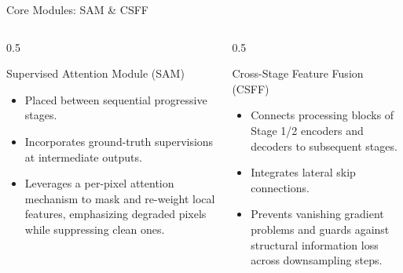 \documentclass[aspectratio=169]{beamer}
\begin{document}
\begin{frame}{Core Modules: SAM \& CSFF}
    \begin{columns}
        \begin{column}{0.5\textwidth}
            \begin{block}{Supervised Attention Module (SAM)}
                \small
                \begin{itemize}
                    \item Placed between sequential progressive stages.
                    \item Incorporates ground-truth supervisions at intermediate outputs.
                    \item Leverages a per-pixel attention mechanism to mask and re-weight local features, emphasizing degraded pixels while suppressing clean ones.
                \end{itemize}
            \end{block}
        \end{column}
        \begin{column}{0.5\textwidth}
            \begin{block}{Cross-Stage Feature Fusion (CSFF)}
                \small
                \begin{itemize}
                    \item Connects processing blocks of Stage 1/2 encoders and decoders to subsequent stages.
                    \item Integrates lateral skip connections.
                    \item Prevents vanishing gradient problems and guards against structural information loss across downsampling steps.
                \end{itemize}
            \end{block}
        \end{column}
    \end{columns}
\end{frame}
\end{document}
